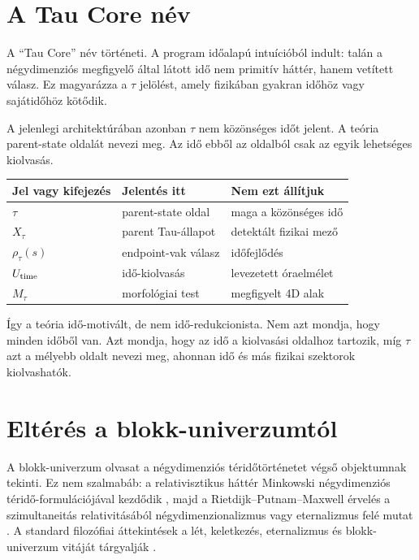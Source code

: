 \documentclass[12pt]{article}
\newcommand{\Rmap}{\rho_{\tau}}
\newcommand{\Mta}{M_{\tau}}
\begin{document}
\section{A Tau Core név}

A ``Tau Core'' név történeti.  A program időalapú intuícióból indult: talán a
négydimenziós megfigyelő által látott idő nem primitív háttér, hanem vetített
válasz.  Ez magyarázza a \(\tau\) jelölést, amely fizikában gyakran időhöz vagy
sajátidőhöz kötődik.

A jelenlegi architektúrában azonban \(\tau\) nem közönséges időt jelent.  A
teória parent-state oldalát nevezi meg.  Az idő ebből az oldalból csak az egyik
lehetséges kiolvasás.
\begin{center}
\begin{tabular}{lll}
\toprule
Jel vagy kifejezés & Jelentés itt & Nem ezt állítjuk\\
\midrule
\(\tau\) & parent-state oldal & maga a közönséges idő\\
\(X_{\tau}\) & parent Tau-állapot & detektált fizikai mező\\
\(\Rmap(s)\) & endpoint-vak válasz & időfejlődés\\
\(U_{\rm time}\) & idő-kiolvasás & levezetett óraelmélet\\
\(\Mta\) & morfológiai test & megfigyelt 4D alak\\
\bottomrule
\end{tabular}
\end{center}

Így a teória idő-motivált, de nem idő-redukcionista.  Nem azt mondja, hogy
minden időből van.  Azt mondja, hogy az idő a kiolvasási oldalhoz tartozik,
míg \(\tau\) azt a mélyebb oldalt nevezi meg, ahonnan idő és más fizikai
szektorok kiolvashatók.

\section{Eltérés a blokk-univerzumtól}

A blokk-univerzum olvasat a négydimenziós téridőtörténetet végső objektumnak
tekinti.  Ez nem szalmabáb: a relativisztikus háttér Minkowski
négydimenziós téridő-formulációjával kezdődik \cite{Minkowski1909}, majd a
Rietdijk--Putnam--Maxwell érvelés a szimultaneitás relativitásából
négydimenzionalizmus vagy eternalizmus felé mutat
\cite{Rietdijk1966,Putnam1967,Maxwell1985,Thyssen2023RPM}.  A standard
filozófiai áttekintések a lét, keletkezés, eternalizmus és blokk-univerzum
vitáját tárgyalják \cite{Savitt2021,MarkosianSullivan2025,PetersonSilberstein2010,Thyssen2020}.
\end{document}
